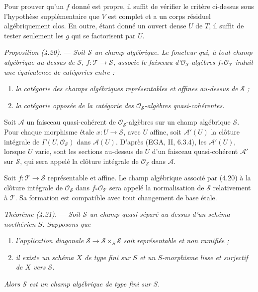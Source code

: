 \documentclass[10pt]{article}
\newcommand{\cO}{\mathcal O}
\begin{document}
Pour prouver qu'un $f$ donné est propre, il suffit de vérifier le critère ci-dessus sous l'hypothèse supplémentaire que $V$ est complet et a un corps résiduel algébriquement clos. En outre, étant donné un ouvert dense $U$ de $T$, il suffit de tester seulement les $g$ qui se factorisent par $U$.

\medskip
\noindent\emph{Proposition (4.20).} --- \emph{Soit $\mathscr S$ un champ algébrique. Le foncteur qui, à tout champ algébrique au-dessus de $\mathscr S$, $f:\mathscr T\to\mathscr S$, associe le faisceau d'$\cO_{\mathscr S}$-algèbres $f_*\cO_{\mathscr T}$ induit une équivalence de catégories entre :}
\begin{enumerate}[label=(\roman*)]
\item \emph{la catégorie des champs algébriques représentables et affines au-dessus de $\mathscr S$ ;}
\item \emph{la catégorie opposée de la catégorie des $\cO_{\mathscr S}$-algèbres quasi-cohérentes.}
\end{enumerate}

Soit $\mathscr A$ un faisceau quasi-cohérent de $\cO_{\mathscr S}$-algèbres sur un champ algébrique $\mathscr S$. Pour chaque morphisme étale $x:U\to\mathscr S$, avec $U$ affine, soit $\mathscr A'(U)$ la clôture intégrale de $\Gamma(U,\cO_{\mathscr S})$ dans $\mathscr A(U)$. D'après (EGA, II, 6.3.4), les $\mathscr A'(U)$, lorsque $U$ varie, sont les sections au-dessus de $U$ d'un faisceau quasi-cohérent $\mathscr A'$ sur $\mathscr S$, qui sera appelé la clôture intégrale de $\cO_{\mathscr S}$ dans $\mathscr A$.

Soit $f:\mathscr T\to\mathscr S$ représentable et affine. Le champ algébrique associé par (4.20) à la clôture intégrale de $\cO_{\mathscr S}$ dans $f_*\cO_{\mathscr T}$ sera appelé la normalisation de $\mathscr S$ relativement à $\mathscr T$. Sa formation est compatible avec tout changement de base étale.

\medskip
\noindent\emph{Théorème (4.21).} --- \emph{Soit $\mathscr S$ un champ quasi-séparé au-dessus d'un schéma noethérien $S$. Supposons que}
\begin{enumerate}[label=(\roman*)]
\item \emph{l'application diagonale $\mathscr S\to\mathscr S\times_S\mathscr S$ soit représentable et non ramifiée ;}
\item \emph{il existe un schéma $X$ de type fini sur $S$ et un $S$-morphisme lisse et surjectif de $X$ vers $\mathscr S$.}
\end{enumerate}
\emph{Alors $\mathscr S$ est un champ algébrique de type fini sur $S$.}
\end{document}

